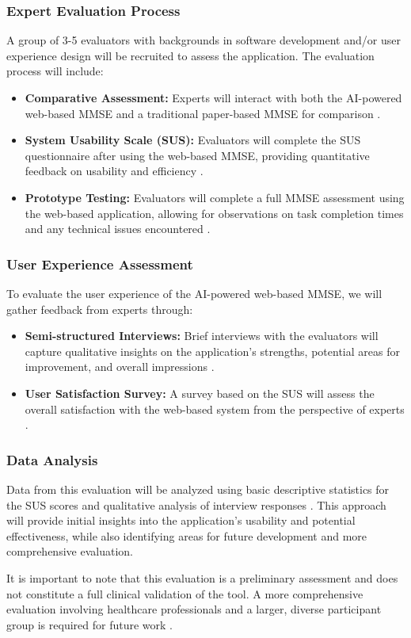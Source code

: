\subsubsection{Expert Evaluation Process}
A group of 3-5 evaluators with backgrounds in software development and/or user experience design will be recruited to assess the application. The evaluation process will include:
\begin{itemize}
\item \textbf{Comparative Assessment:} Experts will interact with both the AI-powered web-based MMSE and a traditional paper-based MMSE for comparison \cite{Bauer2012}.
\item \textbf{System Usability Scale (SUS):} Evaluators will complete the SUS questionnaire after using the web-based MMSE, providing quantitative feedback on usability and efficiency \cite{Brooke1996}.
\item \textbf{Prototype Testing:} Evaluators will complete a full MMSE assessment using the web-based application, allowing for observations on task completion times and any technical issues encountered \cite{Zygouris2017}.
\end{itemize}

\subsubsection{User Experience Assessment}
To evaluate the user experience of the AI-powered web-based MMSE, we will gather feedback from experts through:
\begin{itemize}
\item \textbf{Semi-structured Interviews:} Brief interviews with the evaluators will capture qualitative insights on the application's strengths, potential areas for improvement, and overall impressions \cite{Wild2021}.
\item \textbf{User Satisfaction Survey:} A survey based on the SUS will assess the overall satisfaction with the web-based system from the perspective of experts \cite{Brooke1996}.
\end{itemize}

\subsubsection{Data Analysis}
Data from this evaluation will be analyzed using basic descriptive statistics for the SUS scores and qualitative analysis of interview responses \cite{Braun2006}. This approach will provide initial insights into the application's usability and potential effectiveness, while also identifying areas for future development and more comprehensive evaluation.

It is important to note that this evaluation is a preliminary assessment and does not constitute a full clinical validation of the tool. A more comprehensive evaluation involving healthcare professionals and a larger, diverse participant group is required for future work \cite{Geddes2020}.